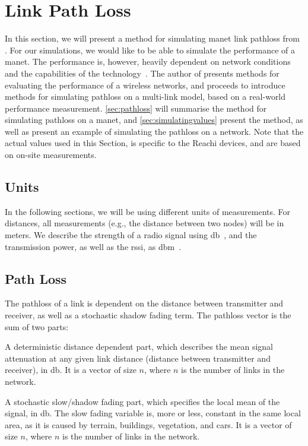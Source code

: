 \section{Link Path Loss}\label{sec:linkmodel}

In this section, we will present a method for simulating \gls{manet} link \gls{pathloss} from \cite{paper:linkmodel}. For our simulations, we would like to be able to simulate the performance of a \gls{manet}. The performance is, however, heavily dependent on network conditions and the capabilities of the technology~\cite[p.~10]{paper:linkmodel}. The author of \cite{paper:linkmodel} presents methods for evaluating the performance of a wireless networks, and proceeds to introduce methods for simulating \gls{pathloss} on a multi-link model, based on a real-world performance measurement. \autoref{sec:pathloss} will summarise the method for simulating \gls{pathloss} on a \gls{manet}, and \autoref{sec:simulatingvalues} present the method, as well as present an example of simulating the \gls{pathloss} on a network. Note that the actual values used in this Section, is specific to the Reachi devices, and are based on on-site measurements.

\subsection{Units}
In the following sections, we will be using different units of measurements. For distances, all measurements (e.g., the distance between two nodes) will be in meters. We describe the strength of a radio signal using \acrfull{db}~\cite{website:isadbdbm}, and the transmission power, as well as the \gls{rssi}, as \acrfull{dbm}~\cite{website:isadbdbm}.

\subsection{Path Loss}\label{sec:pathloss}
The \gls{pathloss} of a link is dependent on the distance between transmitter and receiver, as well as a stochastic shadow fading term. The \gls{pathloss} vector  is the sum of two parts:

\begin{description}[style=nextline]
    \item[$\vect{l_d}$] A deterministic distance dependent part, which describes the mean signal attenuation at any given link distance (distance between transmitter and receiver), in \gls{db}. It is a vector of size $n$, where $n$ is the number of links in the network.
    \item[$\vect{l_{fading}}$] A stochastic slow/shadow fading part, which specifies the local mean of the signal, in \gls{db}. The slow fading variable is, more or less, constant in the same local area, as it is caused by terrain, buildings, vegetation, and cars. It is a vector of size $n$, where $n$ is the number of links in the network.
\end{description}

